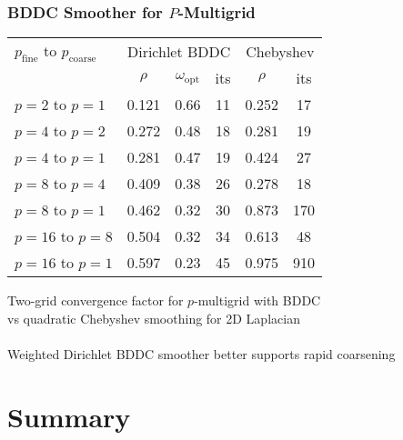 \documentclass{beamer}
\begin{document}
\begin{frame}
\begin{center}
\frametitle{BDDC Smoother for $P$-Multigrid}

\begin{table}[ht!]
\begin{center}
\begin{tabular}{l ccc cc}
  \toprule
  $p_{\text{fine}}$ to $p_{\text{coarse}}$  & \multicolumn{3}{c}{Dirichlet BDDC} & \multicolumn{2}{c}{Chebyshev}  \\
   &  $\rho$ & $\omega_{\text{opt}}$  & its  & $\rho$  &  its  \\
  \toprule
  $p = 2$ to $p = 1$   &  0.121  &  0.66  &  11  &  0.252  &  17   \\
  \midrule
  $p = 4$ to $p = 2$   &  0.272  &  0.48  &  18  &  0.281  &  19   \\
  $p = 4$ to $p = 1$   &  0.281  &  0.47  &  19  &  0.424  &  27   \\
  \midrule
  $p = 8$ to $p = 4$   &  0.409  &  0.38  &  26  &  0.278  &  18   \\
  $p = 8$ to $p = 1$   &  0.462  &  0.32  &  30  &  0.873  &  170  \\
  \midrule
  $p = 16$ to $p = 8$  &  0.504  &  0.32  &  34  &  0.613  &  48   \\
  $p = 16$ to $p = 1$  &  0.597  &  0.23  &  45  &  0.975  &  910  \\
  \bottomrule
\end{tabular}
\end{center}
\label{table:two_grid_bddc_smoother_vs_quadratic_chebyshev}
\end{table}
{\small Two-grid convergence factor for $p$-multigrid with BDDC\\vs quadratic Chebyshev smoothing for 2D Laplacian}\\

~\\

Weighted Dirichlet BDDC smoother better supports rapid coarsening\\

\end{center}
\end{frame}

\section{Summary}
\end{document}
